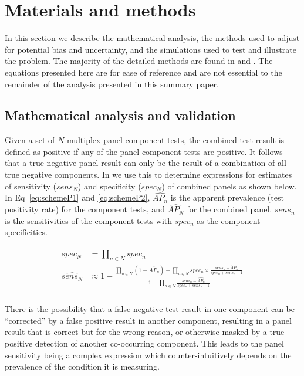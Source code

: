 \documentclass[10pt,letterpaper]{article}
\begin{document}
\section*{Materials and methods}

In this section we describe the mathematical analysis, the methods used to adjust for potential bias and uncertainty, and the simulations used to test and illustrate the problem. The majority of the detailed methods are found in  and . The equations presented here are for ease of reference and are not essential to the remainder of the analysis presented in this summary paper.

\subsection*{Mathematical analysis and validation}

Given a set of \(N\) multiplex panel component tests, the combined test result is defined as positive if any of the panel component tests are positive. It follows that a true negative panel result can only be the result of a combination of all true negative components. In  we use this to determine expressions for estimates of sensitivity (\(sens_N\)) and specificity (\(spec_N\)) of combined panels as shown below. In Eq~\ref{eq:schemeP1} and \ref{eq:schemeP2}, \(\widehat{AP_n}\) is the apparent prevalence (test positivity rate) for the component tests, and \(\widehat{AP_N}\) for the combined panel. \(sens_n\) is the sensitivities of the component tests with \(spec_n\) as the component specificities.

\begin{eqnarray}
\label{eq:schemeP1}
\begin{aligned}
spec_N &= \prod_{n \in N}{spec_n} \\
\widehat{sens_N} &\approx 1-\frac{
  \prod_{n \in N}{(1-\widehat{AP_n})} - \prod_{n \in N}{spec_n \times \frac{sens_n-\widehat{AP_n}}{spec_n + sens_n - 1}}
}{
  1 - \prod_{n \in N}{ \frac{sens_n-\widehat{AP_n}}{spec_n + sens_n - 1} }
} \\
\end{aligned}
\end{eqnarray}

There is the possibility that a false negative test result in one component can be ``corrected'' by a false positive result in another component, resulting in a panel result that is correct but for the wrong reason, or otherwise masked by a true positive detection of another co-occurring component. This leads to the panel sensitivity being a complex expression which counter-intuitively depends on the prevalence of the condition it is measuring.
\end{document}
